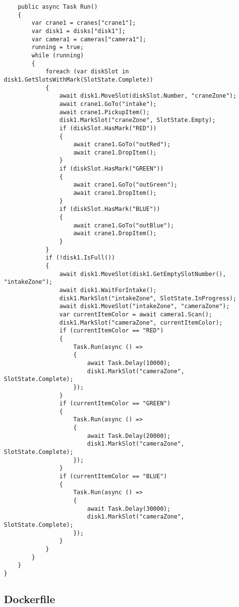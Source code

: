 \begin{verbatim}
    public async Task Run()	
    {
        var crane1 = cranes["crane1"];
        var disk1 = disks["disk1"];
        var camera1 = cameras["camera1"];
        running = true;
        while (running)
        {
            foreach (var diskSlot in disk1.GetSlotsWithMark(SlotState.Complete))
            {
                await disk1.MoveSlot(diskSlot.Number, "craneZone");
                await crane1.GoTo("intake");
                await crane1.PickupItem();
                disk1.MarkSlot("craneZone", SlotState.Empty);
                if (diskSlot.HasMark("RED"))
                {
                    await crane1.GoTo("outRed");
                    await crane1.DropItem();
                }
                if (diskSlot.HasMark("GREEN"))
                {
                    await crane1.GoTo("outGreen");
                    await crane1.DropItem();
                }
                if (diskSlot.HasMark("BLUE"))
                {
                    await crane1.GoTo("outBlue");
                    await crane1.DropItem();
                }
            }
            if (!disk1.IsFull())
            {
                await disk1.MoveSlot(disk1.GetEmptySlotNumber(), "intakeZone");
                await disk1.WaitForIntake();
                disk1.MarkSlot("intakeZone", SlotState.InProgress);
                await disk1.MoveSlot("intakeZone", "cameraZone");
                var currentItemColor = await camera1.Scan();
                disk1.MarkSlot("cameraZone", currentItemColor);
                if (currentItemColor == "RED")
                {
                    Task.Run(async () =>
                    {
                        await Task.Delay(10000);
                        disk1.MarkSlot("cameraZone", SlotState.Complete);
                    });
                }
                if (currentItemColor == "GREEN")
                {
                    Task.Run(async () =>
                    {
                        await Task.Delay(20000);
                        disk1.MarkSlot("cameraZone", SlotState.Complete);
                    });
                }
                if (currentItemColor == "BLUE")
                {
                    Task.Run(async () =>
                    {
                        await Task.Delay(30000);
                        disk1.MarkSlot("cameraZone", SlotState.Complete);
                    });
                }
            }
        }
    }
}    
\end{verbatim}

\subsection{Dockerfile}\label{appendix:orchestrator-updated-dockerfile}

